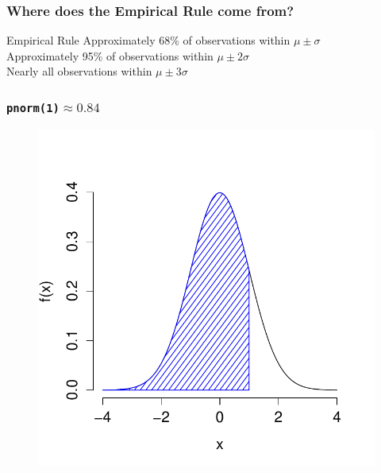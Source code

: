 \documentclass[handout]{beamer}
\begin{document}
\begin{frame}
\frametitle{Where does the Empirical Rule come from?}

\begin{block}{Empirical Rule}
Approximately 68\% of observations within $\mu\pm \sigma$\\
Approximately 95\% of observations within $\mu\pm 2 \sigma$\\
Nearly all observations within $\mu\pm 3 \sigma$
\end{block}
\end{frame}


\begin{frame}
\frametitle{\texttt{pnorm(1)}$\approx 0.84$}

\begin{figure}
\includegraphics[scale = 0.65]{./images/middle68_1}
\end{figure}
\end{frame}
\end{document}
